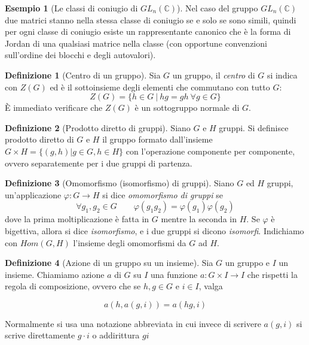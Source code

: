 \documentclass[11pt]{article}
\theoremstyle{plain}
\theoremstyle{definition}
\newtheorem{defn}{Definizione}[section]
\newtheorem{exmp}{Esempio}[section]
\theoremstyle{remark}
\newcommand{\C}{\mathbb{C}}
\begin{document}
\begin{exmp}[Le classi di coniugio di $GL_n(\C)$]
Nel caso del gruppo $GL_n(\C)$ due matrici stanno nella stessa classe di coniugio se e solo se sono simili, quindi per ogni classe di coniugio esiste un rappresentante canonico che è la forma di Jordan di una qualsiasi matrice nella classe (con opportune convenzioni sull'ordine dei blocchi e degli autovalori).
\end{exmp}

\begin{defn}[Centro di un gruppo]
	Sia $G$ un gruppo, il \textit{centro} di $G$ si indica con $Z(G)$ ed è il sottoinsieme degli elementi che commutano con tutto $G$:
	\[
		Z(G)=\{ h\in G\ |\ hg=gh\ \forall g\in G \}
	\]
	\`E immediato verificare che $Z(G)$ è un sottogruppo normale di $G$.

\end{defn}

\begin{defn}[Prodotto diretto di gruppi]
Siano $G$ e $H$ gruppi. Si definisce prodotto diretto di $G$ e $H$ il gruppo formato dall'insieme $G \times H = \{ (g, h) | g \in G, h \in H\}$ con l'operazione componente per componente, ovvero separatemente per i due gruppi di partenza.
\end{defn}


\begin{defn}[Omomorfismo (isomorfismo) di gruppi]
Siano $G$ ed $H$ gruppi, un'applicazione $\varphi:G\to H$ si dice \textit{omomorfismo di gruppi} se
\[
	\forall g_1,g_2\in G\qquad \varphi(g_1 g_2)=\varphi(g_1)\varphi(g_2)
\]
dove la prima moltiplicazione è fatta in $G$ mentre la seconda in $H$.
Se $\varphi$ è bigettiva, allora si dice \textit{isomorfismo}, e i due gruppi si dicono \emph{isomorfi}.
Indichiamo con $Hom(G,H)$ l'insieme degli omomorfismi da $G$ ad $H$.
\end{defn}


\begin{defn}[Azione di un gruppo su un insieme] Sia $G$ un gruppo e $I$ un insieme. Chiamiamo azione $a$ di $G$ su $I$ una funzione $a:G\times I \to I$ che rispetti la regola di composizione, ovvero che se $h,g\in G$ e $i \in I$, valga

\[ a(h,a(g,i)) = a(hg, i) \]

Normalmente si usa una notazione abbreviata in cui invece di scrivere $a(g,i)$ si scrive direttamente $g\cdot i$ o addirittura $gi$


\label{defn:azione}
\end{defn}
\end{document}
